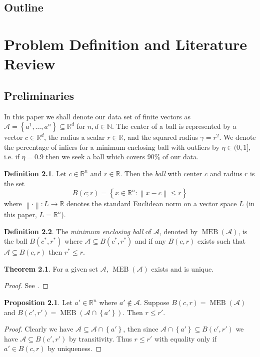 \documentclass[11pt,twoside]{report}
\newcommand{\A}{\mathcal{A}} %
\newcommand{\norm}[1]{\left\lVert#1\right\rVert}
\DeclareMathOperator{\MEB}{MEB}
\theoremstyle{definition}
\newtheorem{definition}{Definition}
\newtheorem{theorem}{Theorem}
\newtheorem{proposition}{Proposition}
\numberwithin{theorem}{section}
\numberwithin{definition}{section}
\numberwithin{lemma}{section}
\numberwithin{proposition}{section}
\numberwithin{equation}{section}
\numberwithin{figure}{section}
\begin{document}
\section{Outline}

\chapter{Problem Definition and Literature Review}\label{exact}
\section{Preliminaries}
In this paper we shall denote our data set of finite vectors as $\mathcal{A} = \left\{a^1,\ldots,a^n\right\}\subseteq\mathbb{R}^d$ for $n,d\in\mathbb{N}$. The center of a ball is represented by a vector $c\in\mathbb{R}^d$, the radius a scalar $r\in\mathbb{R}$, and the squared radius $\gamma=r^2$. We denote the percentage of inliers for a minimum enclosing ball with outliers by $\eta\in(0,1]$, i.e. if $\eta=0.9$ then we seek a ball which covers $90\%$ of our data.

\begin{definition}
Let $c\in\mathbb{R}^n$ and $r\in\mathbb{R}$. Then the \textit{ball} with center $c$ and radius $r$ is the set
\begin{equation*}
    B(c;r) = \left\{x\in\mathbb{R}^n : \norm{x-c} \leq r\right\}
\end{equation*}
where $\norm{\cdot}:L\to\mathbb{R}$ denotes the standard Euclidean norm on a vector space $L$ (in this paper, $L=\mathbb{R}^n$).
\end{definition}

\begin{definition}
The \textit{minimum enclosing ball} of $\A$, denoted by $\MEB(\A)$, is the ball $B(c^*,r^*)$ where $\A\subseteq B(c^*,r^*)$ and if any $B(c,r)$ exists such that $\mathcal{A}\subseteq B(c,r)$ then $r^*\leq r$.
\end{definition}

\begin{theorem}
For a given set $\A$, $\MEB(\A)$ exists and is unique.
\end{theorem}
\begin{proof}
See \cite[page 5]{two-algorithms}.
\end{proof}

\begin{proposition}\label{adding data}
Let $a'\in\mathbb{R}^n$ where $a'\notin\A$. Suppose $B(c,r)=\MEB(\A)$ and $B(c',r')=\MEB(\A\cap\left\{a'\right\})$. Then $r\leq r'$.
\end{proposition}
\begin{proof}
Clearly we have $\A\subseteq\A\cap\left\{a'\right\}$, then since $\A\cap\left\{a'\right\}\subseteq B(c',r')$ we have $\mathcal{A}\subseteq B(c',r')$ by transitivity. Thus $r\leq r'$ with equality only if $a'\in B(c,r)$ by uniqueness.
\end{proof}
\end{document}
